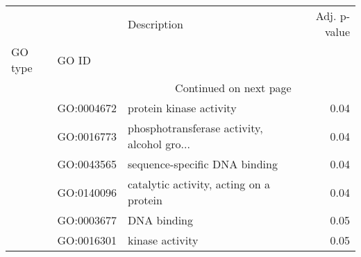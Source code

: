 \begin{longtable}{lllr}
\toprule
   &            &                                  Description &  Adj. p-value \\
GO type & GO ID &                                              &               \\
\midrule
\endhead
\midrule
\multicolumn{3}{r}{{Continued on next page}} \\
\midrule
\endfoot

\bottomrule
\endlastfoot
\multirow{6}{*}{MF} & GO:0004672 &                      protein kinase activity &          0.04 \\
   & GO:0016773 &  phosphotransferase activity, alcohol gro... &          0.04 \\
   & GO:0043565 &                sequence-specific DNA binding &          0.04 \\
   & GO:0140096 &      catalytic activity, acting on a protein &          0.04 \\
   & GO:0003677 &                                  DNA binding &          0.05 \\
   & GO:0016301 &                              kinase activity &          0.05 \\
\end{longtable}
